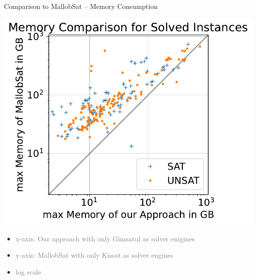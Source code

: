 \documentclass[]{sdqbeamer}
\begin{document}
\begin{frame}{Comparison to MallobSat -- Memory Consumption}
    \begin{minipage}{.45\textwidth}
        \center
        \includegraphics[scale=.8]{plots/square_mem_compare/square_mem_16node.pdf}\\
    \end{minipage}
    \hfill
    \begin{minipage}{.45\textwidth}
        \begin{itemize}
            \item \textcolor{gray}{x-axis: Our approach with only Gimsatul as solver enigines}
            \item \textcolor{gray}{y-axis: MallobSat with only Kissat as solver engines}
            \item \textcolor{gray}{log scale}
        \end{itemize}
    \end{minipage}
\end{frame}
\end{document}
